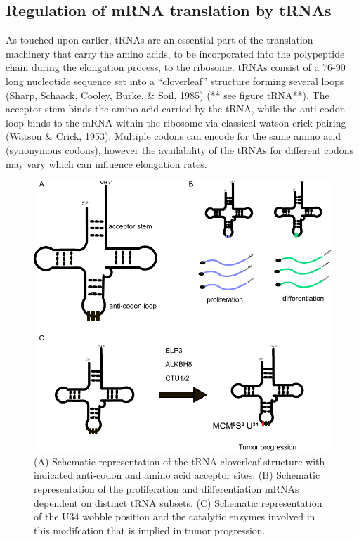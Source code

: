 \documentclass[12pt,openany]{book}
\begin{document}
\subsection{Regulation of mRNA translation by tRNAs} \label{tRNA}

As touched upon earlier, tRNAs are an essential part of the translation
machinery that carry the amino acids, to be incorporated into the
polypeptide chain during the elongation process, to the ribosome. tRNAs
consist of a 76-90 long nucleotide sequence set into a ``cloverleaf''
structure forming several loops (Sharp, Schaack, Cooley, Burke, \& Soil,
1985) (** see figure tRNA**). The acceptor stem binds the amino acid
carried by the tRNA, while the anti-codon loop binds to the mRNA within
the ribosome via classical watson-crick pairing (Watson \& Crick, 1953).
Multiple codons can encode for the same amino acid (synonymous codons),
however the availability of the tRNAs for different codons may vary
which can influence elongation rates.

\begin{figure}
  \includegraphics{./figures/tRNA.pdf}
  \caption{ (A) Schematic representation of the tRNA cloverleaf structure with indicated anti-codon and amino acid acceptor sites.  (B) Schematic representation of the proliferation and differentiation mRNAs dependent on distinct tRNA subsets. (C) Schematic representation of the U34 wobble position and the catalytic enzymes involved in this modifcation that is implied in tumor progression.
 \label{fig:tRNA}}
\end{figure}
\end{document}
